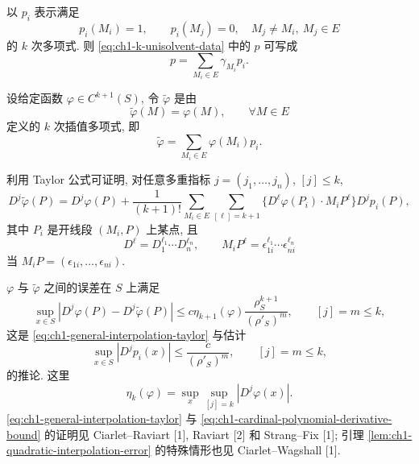 以 $p_i$ 表示满足
\begin{equation}
p_i(M_i)=1,\qquad
p_i(M_j)=0,\quad M_j\neq M_i,\ M_j\in E
\label{eq:ch1-unisolvent-cardinal-polynomials}
\end{equation}
的 $k$ 次多项式. 则 \eqref{eq:ch1-k-unisolvent-data} 中的 $p$ 可写成
\begin{equation}
p=\sum_{M_i\in E}\gamma_{M_i}p_i.
\label{eq:ch1-unisolvent-interpolation-expansion}
\end{equation}

设给定函数 $\varphi\in C^{k+1}(S)$, 令 $\widetilde\varphi$ 是由
\begin{equation}
\widetilde\varphi(M)=\varphi(M),\qquad\forall M\in E
\label{eq:ch1-general-interpolant-values}
\end{equation}
定义的 $k$ 次插值多项式, 即
\begin{equation}
\widetilde\varphi=\sum_{M_i\in E}\varphi(M_i)p_i.
\label{eq:ch1-general-interpolant-expansion}
\end{equation}

利用 Taylor 公式可证明, 对任意多重指标 $j=(j_1,\ldots,j_n)$, $[j]\leq k$,
\begin{equation}
D^j\widetilde\varphi(P)
=D^j\varphi(P)
+\frac1{(k+1)!}\sum_{M_i\in E}\sum_{[\ell]=k+1}
\{D^\ell\varphi(P_i)\cdot M_iP^\ell\}D^jp_i(P),
\label{eq:ch1-general-interpolation-taylor}
\end{equation}
其中 $P_i$ 是开线段 $(M_i,P)$ 上某点, 且
\[
D^\ell=D_1^{\ell_1}\cdots D_n^{\ell_n},
\qquad
M_iP^\ell=\epsilon_{1i}^{\ell_1}\cdots\epsilon_{ni}^{\ell_n}
\]
当 $M_iP=(\epsilon_{1i},\ldots,\epsilon_{ni})$.

$\varphi$ 与 $\widetilde\varphi$ 之间的误差在 $S$ 上满足
\begin{equation}
\sup_{x\in S}|D^j\varphi(P)-D^j\widetilde\varphi(P)|
\leq c\eta_{k+1}(\varphi)\frac{\rho_S^{k+1}}{(\rho'_S)^m},
\qquad[j]=m\leq k,
\label{eq:ch1-general-simplex-interpolation-error}
\end{equation}
这是 \eqref{eq:ch1-general-interpolation-taylor} 与估计
\begin{equation}
\sup_{x\in S}|D^jp_i(x)|
\leq\frac{c}{(\rho'_S)^m},
\qquad[j]=m\leq k,
\label{eq:ch1-cardinal-polynomial-derivative-bound}
\end{equation}
的推论. 这里
\[
\eta_k(\varphi)=\sup_x\sup_{[j]=k}|D^j\varphi(x)|.
\]
\eqref{eq:ch1-general-interpolation-taylor} 与 \eqref{eq:ch1-cardinal-polynomial-derivative-bound} 的证明见 Ciarlet--Raviart [1], Raviart [2] 和 Strang--Fix [1]; 引理 \ref{lem:ch1-quadratic-interpolation-error} 的特殊情形也见 Ciarlet--Wagshall [1].

